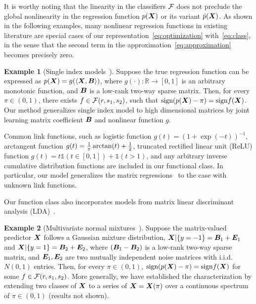 \documentclass[11pt]{article}
\theoremstyle{plain}
\theoremstyle{definition}
\newtheorem{example}{Example}
\def\sign{\textup{sign}}
\begin{document}
It is worthy noting that the linearity in the classifiers $\mathcal{F}$ does not preclude the global nonlinearity in the regression function $p(\bm X)$ or its variant $\bar p(\bm X)$. As shown in the following examples, many nonlinear regression functions in existing literature are special cases of our representation~\eqref{eq:optimization} with~\eqref{eq:class}, in the sense that the second term in the approximation~\eqref{eq:approximation} becomes precisely zero. 

\begin{example}[Single index models~\citep{alquier2013sparse,ganti2017learning}]\label{example:1}
Suppose the true regression function can be expressed as $p(\bm X)= g(\langle \bm X,\bm B\rangle)$, where $g(\cdot)\colon \mathbb{R}\to [0,1]$ is an arbitrary monotonic function, and $\bm B$ is a low-rank two-way sparse matrix. Then, for every $\pi\in(0,1)$, there exists $f\in \mathcal{F}(r,s_1,s_2)$, such that $\sign(p(\mX)-\pi)= \sign f(\mX)$. Our method generalizes single index model to high dimensional matrices by joint learning matrix coefficient $\bm B$ and nonlinear function $g$. 
\end{example}

Common link functions, such as logistic function $g(t)=(1+\exp(-t))^{-1}$, arctangent function $g(t)={1\over \pi}\arctan(t)+{1\over 2}$, truncated rectified linear unit (ReLU) function $g(t)=t\mathds{1}(t\in[0,1])+\mathds{1}(t>1)$, and any arbitrary inverse cumulative distribution functions are included in our functional class. In particular, our model generalizes the matrix regressions~\citep{zhou2014regularized,guha2020bayesian,relion2019network} to the case with unknown link functions. 

Our function class also incorporates models from matrix linear discriminant analysis (LDA)~\citep{hu2020matrix}. 

\begin{example}[Multivariate normal mixtures~\citep{hu2020matrix}] Suppose the matrix-valued predictor $\bm X$ follows a Gaussian mixture distribution, $\bm X|\{y=-1\}=\bm B_1+\bm{E}_1$ and $ \bm X|\{y=1\}=\bm B_2+\bm{E}_2$, where $(\bm B_1-\bm B_2)$ is a low-rank two-way sparse matrix, and $\bm{E}_1, \bm{E}_2$ are two mutually independent noise matrices with i.i.d.\ $N(0,1)$ entries. Then, for every $\pi\in(0,1)$, $\sign(p(\mX)-\pi)= \sign f(\mX)$ for some $f\in \mathcal{F}(r,s_1,s_2)$. More generally, we have established the characterization by extending two classes of $\bm X$ to a series of $\bm X=\bm X(\pi)$ over a continuous spectrum of $\pi \in (0,1)$ (results not shown). 
\end{example}
\end{document}

